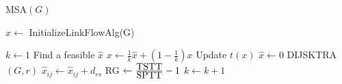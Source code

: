 \begin{algorithm}
\caption{MSA$(G)$}
\label{alg:msa}
\begin{algorithmic}[1]
\STATE  $\hat{x}\leftarrow$ InitializeLinkFlowAlg(G)

\STATE $k\leftarrow 1$
\STATE Find a feasible $\hat{x}$
	\STATE $x\leftarrow \frac{1}{k}\hat{x} + (1-\frac{1}{k})x$
	\STATE Update $t(x)$
	\STATE $\hat{x}\leftarrow 0$
		\STATE DIJSKTRA$(G, r)$
			\STATE $\hat{x}_{ij} \leftarrow \hat{x}_{ij}+d_{rs}$
		\ENDFOR
	\ENDFOR
	\STATE RG $\leftarrow \frac{\hbox{TSTT}}{\hbox{SPTT}} - 1$
	\STATE $k\leftarrow k+1$
\ENDWHILE
\end{algorithmic}
\end{algorithm}
